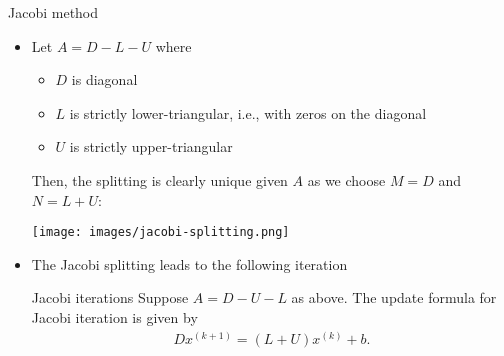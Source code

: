 \documentclass[t,usepdftitle=false]{beamer}
\begin{document}
\begin{frame}{Jacobi method}
\begin{itemize}
\item Let $A=D-L-U$ where\vspace{.1cm}
\begin{itemize}
\item $D$ is diagonal\vspace{.1cm}
\item $L$ is strictly lower-triangular, i.e., with zeros on the diagonal\vspace{.1cm}
\item $U$ is strictly upper-triangular\vspace{.1cm}
\end{itemize}
Then, the splitting is clearly unique given $A$ as we choose $M=D$ and $N=L+U$:
\begin{center}
\texttt{[image: images/jacobi-splitting.png]}\vspace{.2cm}
\end{center}
\item The Jacobi splitting leads to the following iteration
\begin{block}{Jacobi iterations}
Suppose $A=D-U-L$ as above.
The update formula for Jacobi iteration is given by\vspace{-.4cm}
\begin{align*}
Dx^{(k+1)}=(L+U)x^{(k)}+b.
\end{align*}
\end{block}
\end{itemize}
\end{frame}
\end{document}
